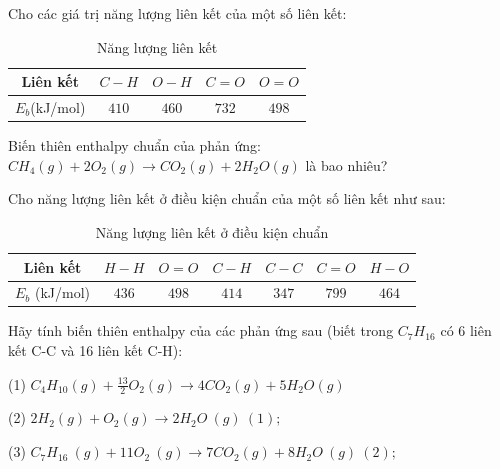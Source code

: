 \documentclass[Main.tex]{subfiles}
\begin{document}
\begin{bt}
	Cho các giá trị năng lượng liên kết của một số liên kết:
	\begin{table}[h]
		\centering
		\begin{tabular}{|c|c|c|c|c|}
			\hline
			Liên kết & $C-H$ & $O-H$ & $C=O$ & $O=O$ \\
			\hline
			$E_b$(kJ/mol) & $410$ & $460$ & $732$ & $498$ \\
			\hline
		\end{tabular}
		\caption{Năng lượng liên kết}
		\label{nang_luong_lien_ket_2}
	\end{table}
	Biến thiên enthalpy chuẩn của phản ứng: $CH_4(g) + 2O_2(g) \longrightarrow CO_2(g) + 2H_2O(g)$ là bao nhiêu?
\end{bt}
\begin{bt}
	Cho năng lượng liên kết ở điều kiện chuẩn của một số liên kết như sau:
	\begin{table}[h]
		\centering
		\begin{tabular}{|c|c|c|c|c|c|c|}
			\hline
			Liên kết & $H-H$ & $O=O$ & $C-H$ & $C-C$ & $C=O$ & $H-O$ \\
			\hline
			$E_b$ (kJ/mol) & $436$ & $498$ & $414$ & $347$ & $799$ & $464$ \\
			\hline
		\end{tabular}
		\caption{Năng lượng liên kết ở điều kiện chuẩn}
		\label{nang_luong_lien_ket_chuan}
	\end{table}
	Hãy tính biến thiên enthalpy của các phản ứng sau (biết trong $C_7H_{16}$ có 6 liên kết C-C và 16 liên kết C-H):
	
	(1) $C_4H_{10}(g) + \frac{13}{2} O_2(g) \longrightarrow 4CO_2(g) + 5H_2O(g)$
	
	(2) $2H_2(g) + O_2(g) \longrightarrow 2H_2O \ (g) \ (1);$
	
	(3) $C_7H_{16} \ (g) + 11O_2 \ (g) \longrightarrow 7CO_2(g) + 8H_2O \ (g) \ (2);$
\end{bt}
\end{document}
